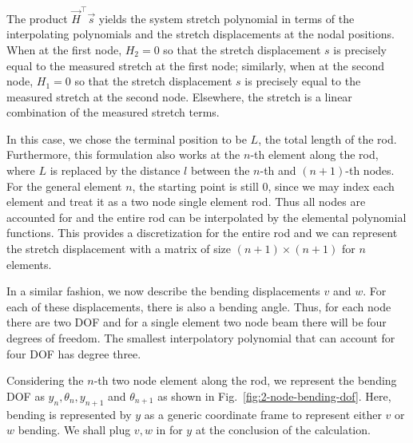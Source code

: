 The product $\vec{H}^\top\vec{s}$ yields the system stretch polynomial in terms of the interpolating polynomials and the stretch displacements at the nodal positions. When at the first node, $H_2 = 0$ so that the stretch displacement $s$ is precisely equal to the measured stretch at the first node; similarly, when at the second node, $H_1 = 0$ so that the stretch displacement $s$ is precisely equal to the measured stretch at the second node. Elsewhere, the stretch is a linear combination of the measured stretch terms.

In this case, we chose the terminal position to be $L$, the total length of the rod. Furthermore, this formulation also works at the $n$-th element along the rod, where $L$ is replaced by the distance $l$ between the $n$-th and $(n+1)$-th nodes. For the general element $n$, the starting point is still $0$, since we may index each element and treat it as a two node single element rod. Thus all nodes are accounted for and the entire rod can be interpolated by the elemental polynomial functions. This provides a discretization for the entire rod and we can represent the stretch displacement with a matrix of size $(n+1) \times (n+1)$ for $n$ elements.

In a similar fashion, we now describe the bending displacements $v$ and $w$. For each of these displacements, there is also a bending angle. Thus, for each node there are two DOF and for a single element two node beam there will be four degrees of freedom. The smallest interpolatory polynomial that can account for four DOF has degree three. 


Considering the $n$-th two node element along the rod, we represent the bending DOF as $y_n,\theta_n,y_{n+1}$ and $\theta_{n+1}$ as shown in Fig.~\ref{fig:2-node-bending-dof}. Here, bending is represented by $y$ as a generic coordinate frame to represent either $v$ or $w$ bending. We shall plug $v,w$ in for $y$ at the conclusion of the calculation. 


